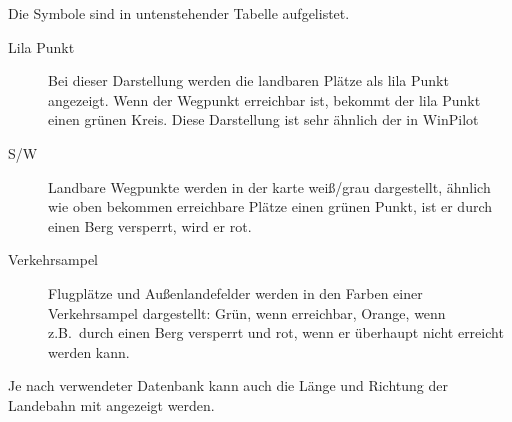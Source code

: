 Die Symbole sind in untenstehender Tabelle aufgelistet. 
\begin{description}
   \item[Lila Punkt] Bei dieser Darstellung werden die landbaren Plätze als lila Punkt angezeigt. Wenn der Wegpunkt erreichbar ist, bekommt der lila Punkt einen grünen Kreis.  Diese Darstellung ist sehr ähnlich der in WinPilot
   \item[S/W]  Landbare Wegpunkte werden in der karte weiß/grau dargestellt, ähnlich wie oben bekommen erreichbare Plätze einen grünen Punkt, ist er durch einen Berg versperrt, wird er rot. 
   \item[Verkehrsampel] Flugplätze und Außenlandefelder werden in den Farben einer Verkehrsampel dargestellt: Grün, wenn erreichbar, Orange, wenn z.B.\ durch einen Berg versperrt und rot, wenn er überhaupt nicht erreicht werden kann.
\end{description}

\tip Je nach verwendeter Datenbank kann auch die Länge und Richtung der Landebahn mit angezeigt werden. 


